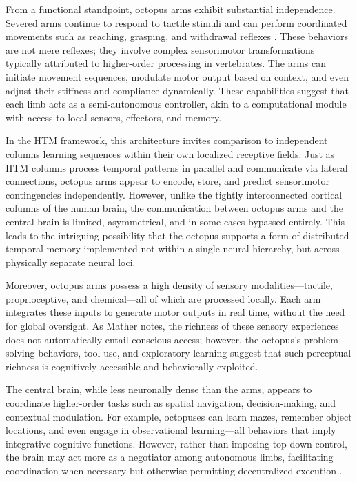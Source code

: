\documentclass{article}
\begin{document}
From a functional standpoint, octopus arms exhibit substantial independence. Severed arms continue to respond to tactile stimuli and can perform coordinated movements such as reaching, grasping, and withdrawal reflexes \parencite{carls2022where}. These behaviors are not mere reflexes; they involve complex sensorimotor transformations typically attributed to higher-order processing in vertebrates. The arms can initiate movement sequences, modulate motor output based on context, and even adjust their stiffness and compliance dynamically. These capabilities suggest that each limb acts as a semi-autonomous controller, akin to a computational module with access to local sensors, effectors, and memory.

In the HTM framework, this architecture invites comparison to independent columns learning sequences within their own localized receptive fields. Just as HTM columns process temporal patterns in parallel and communicate via lateral connections, octopus arms appear to encode, store, and predict sensorimotor contingencies independently. However, unlike the tightly interconnected cortical columns of the human brain, the communication between octopus arms and the central brain is limited, asymmetrical, and in some cases bypassed entirely. This leads to the intriguing possibility that the octopus supports a form of distributed temporal memory implemented not within a single neural hierarchy, but across physically separate neural loci.

Moreover, octopus arms possess a high density of sensory modalities—tactile, proprioceptive, and chemical—all of which are processed locally. Each arm integrates these inputs to generate motor outputs in real time, without the need for global oversight. As Mather \parencite{mather2021octopus} notes, the richness of these sensory experiences does not automatically entail conscious access; however, the octopus's problem-solving behaviors, tool use, and exploratory learning suggest that such perceptual richness is cognitively accessible and behaviorally exploited.

The central brain, while less neuronally dense than the arms, appears to coordinate higher-order tasks such as spatial navigation, decision-making, and contextual modulation. For example, octopuses can learn mazes, remember object locations, and even engage in observational learning—all behaviors that imply integrative cognitive functions. However, rather than imposing top-down control, the brain may act more as a negotiator among autonomous limbs, facilitating coordination when necessary but otherwise permitting decentralized execution \parencite{carls2022where}.
\end{document}
